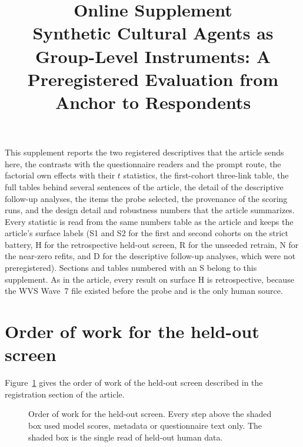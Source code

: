 \documentclass[12pt]{article}
\title{Online Supplement\\[0.6em]\large Synthetic Cultural Agents as Group-Level Instruments: A Preregistered Evaluation from Anchor to Respondents}
\author{}
\date{}
\begin{document}
\maketitle
\thispagestyle{empty}

\noindent This supplement reports the two registered descriptives that the article sends here, the contrasts with the questionnaire readers and the prompt route, the factorial own effects with their $t$ statistics, the first-cohort three-link table, the full tables behind several sentences of the article, the detail of the descriptive follow-up analyses, the items the probe selected, the provenance of the scoring runs, and the design detail and robustness numbers that the article summarizes. Every statistic is read from the same numbers table as the article and keeps the article's surface labels (S1 and S2 for the first and second cohorts on the strict battery, H for the retrospective held-out screen, R for the unseeded retrain, N for the near-zero refits, and D for the descriptive follow-up analyses, which were not preregistered). Sections and tables numbered with an S belong to this supplement. As in the article, every result on surface H is retrospective, because the WVS Wave~7 file existed before the probe and is the only human source.

\section{Order of work for the held-out screen}\label{sec:s-timeline}

Figure~\ref{fig:s-timeline} gives the order of work of the held-out screen described in the registration section of the article.

\begin{figure}[htbp]
\centering
{}
\caption{Order of work for the held-out screen. Every step above the shaded box used model scores, metadata or questionnaire text only. The shaded box is the single read of held-out human data.}\label{fig:s-timeline}
\end{figure}
\end{document}
